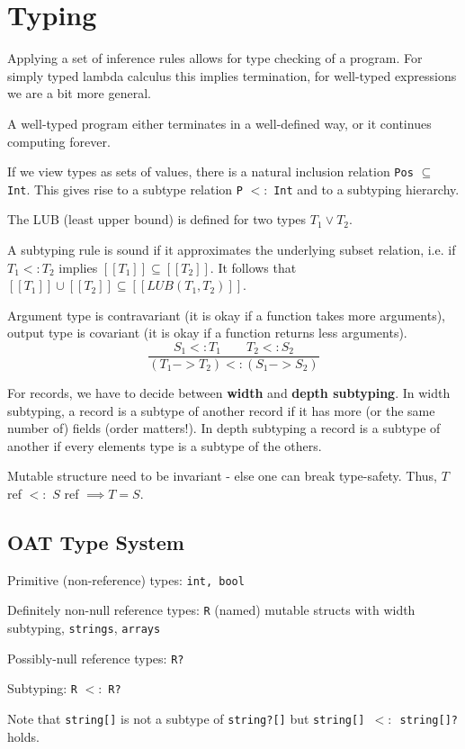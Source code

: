 \section*{Typing}

Applying a set of inference rules allows for type checking of a program. For simply typed lambda calculus this implies termination, for well-typed expressions we are a bit more general. \medskip

A well-typed program either terminates in a well-defined way, or it continues computing forever.\medskip
	
If we view types as sets of values, there is a natural inclusion relation \texttt{Pos} $ \subseteq $ \texttt{Int}. This gives rise to a subtype relation \texttt{P} $<:$ \texttt{Int} and to a subtyping hierarchy. \medskip

The LUB (least upper bound) is defined for two types $T_1 \vee T_2$.\medskip
	
A subtyping rule is sound if it approximates the underlying subset relation, i.e. if $T_1 <: T_2$ implies $[[T_1]] \subseteq [[T_2]]$. It follows that $[[T_1]] \cup [[T_2]] \subseteq [[LUB(T_1, T_2)]]$. \medskip
	
Argument type is contravariant (it is okay if a function takes more arguments), output type is covariant (it is okay if a function returns less arguments).
	$$\frac{S_1 <: T_1 \qquad T_2 <: S_2}{(T_1 -> T_2) <: (S_1 -> S_2)}$$\medskip
	
For records, we have to decide between \textbf{width} and \textbf{depth subtyping}. In width subtyping, a record is a subtype of another record if it has more (or the same number of) fields (order matters!). In depth subtyping a record is a subtype of another if every elements type is a subtype of the others.\medskip

Mutable structure need to be invariant - else one can break type-safety. Thus, $T$ ref $<:$ $S$ ref $\implies T = S$.


\subsection*{OAT Type System}

Primitive (non-reference) types: \texttt{int, bool} \medskip
	
Definitely non-null reference types: \texttt{R} (named) mutable structs with width subtyping, \texttt{strings}, \texttt{arrays} \medskip
	
Possibly-null reference types: \texttt{R?} \medskip
	
Subtyping: \texttt{R} $<:$ \texttt{R?}\medskip

Note that \texttt{string[]} is not a subtype of \texttt{string?[]} but \texttt{string[] $<:$ string[]?} holds.
